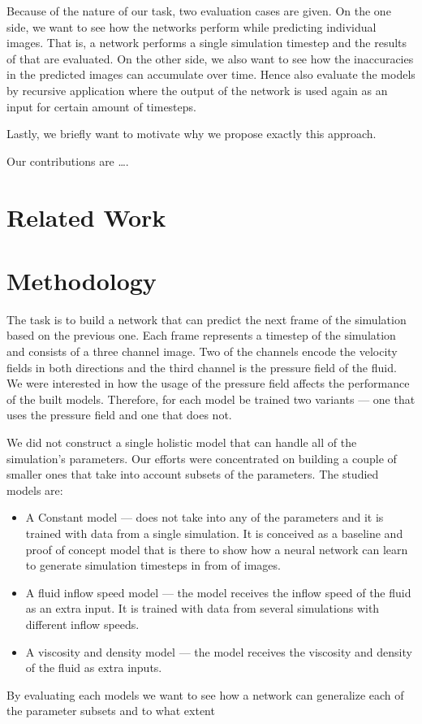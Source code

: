 \documentclass{llncs}
\begin{document}
Because of the nature of our task, two evaluation cases are given. On the one side, we want to see how the networks perform while predicting individual images. That is, a network performs a single simulation timestep and the results of that are evaluated. On the other side, we also want to see how the inaccuracies in the predicted images can accumulate over time. Hence also evaluate the models by recursive application where the output of the network is used again as an input for certain amount of timesteps.

Lastly, we briefly want to motivate why we propose exactly this approach.


Our contributions are \ldots.

\section{Related Work}\label{related_work}

\section{Methodology}\label{methodology}

The task is to build a network that can predict the next frame of the simulation based on the previous one. Each frame represents a timestep of the simulation and consists of a three channel image. Two of the channels encode the velocity fields in both directions and the third channel is the pressure field of the fluid. We were interested in how the usage of the pressure field affects the performance of the built models. Therefore, for each model be trained two variants --- one that uses the pressure field and one that does not.

We did not construct a single holistic model that can handle all of the simulation's parameters. Our efforts were concentrated on building a couple of smaller ones that take into account subsets of the parameters. The studied models are:
\begin{itemize}
\item A Constant model --- does not take into any of the parameters and it is trained with data from a single simulation. It is conceived as a baseline and proof of concept model that is there to show how a neural network can learn to generate simulation timesteps in from of images.
\item A fluid inflow speed model --- the model receives the inflow speed of the fluid as an extra input. It is trained with data from several simulations with different inflow speeds.
\item A viscosity and density model --- the model receives the viscosity and density of the fluid as extra inputs.
\end{itemize}
By evaluating each models we want to see how a network can generalize each of the parameter subsets and to what extent
\end{document}
